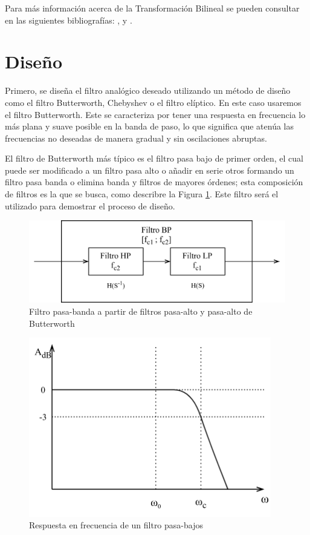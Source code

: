 Para más información acerca de la Transformación Bilineal se pueden consultar en las siguientes bibliografías: \cite{proakis1996digital}, \cite{oppenheim1989discrete} y \cite{oppenheim1999digital}.

\section{Diseño}
Primero, se diseña el filtro analógico deseado utilizando un método de diseño como el filtro Butterworth, Chebyshev o el filtro elíptico. En este caso usaremos el filtro Butterworth. Este se caracteriza por tener una respuesta en frecuencia lo más plana y suave posible en la banda de paso, lo que significa que atenúa las frecuencias no deseadas de manera gradual y sin oscilaciones abruptas.

El filtro de Butterworth más típico es el filtro pasa bajo de primer orden, el cual puede ser modificado a un filtro pasa alto o añadir en serie otros formando un filtro pasa banda o elimina banda y filtros de mayores órdenes; esta composición de filtros es la que se busca, como describre la Figura \ref{fig:diagrama_filtro_pasa_banda}. Este filtro será el utilizado para demostrar el proceso de diseño.

\begin{figure}[H]
  \centering
  \includegraphics[width=400pt]{images/diagramas-bloques-pasa-banda.png}
  \caption{Filtro pasa-banda a partir de filtros pasa-alto y pasa-alto de Butterworth}
  \label{fig:diagrama_filtro_pasa_banda}
\end{figure}

\begin{figure}[H]
  \centering
  \includegraphics[width=300pt]{images/diagramas-bode-pasa-bajo.png}
  \caption{Respuesta en frecuencia de un filtro pasa-bajos}
  \label{fig:diagrama_bode_pasa_bajos}
\end{figure}

